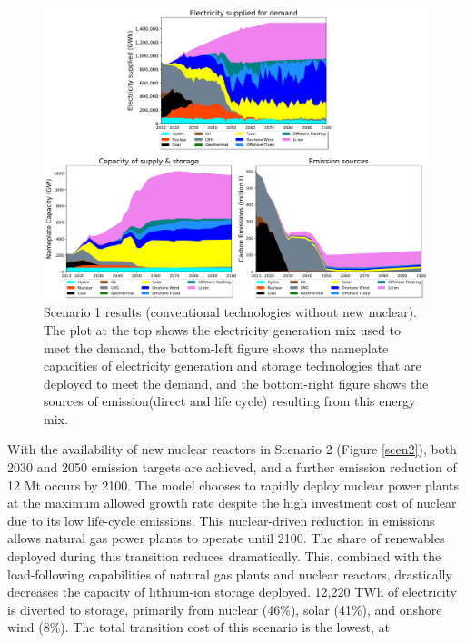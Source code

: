 \begin{figure}[H] 
\centering
\includegraphics[scale=0.5]{figures/conv_nonuc}
\caption{Scenario 1 results (conventional technologies without new nuclear). The plot at the top shows the electricity generation mix used to meet the demand, the bottom-left figure shows the nameplate capacities of electricity generation and storage technologies that are deployed to meet the demand, and the bottom-right figure shows the sources of emission(direct and life cycle) resulting from this energy mix.}
\label{scen1}
\end{figure}

With the availability of new nuclear reactors in Scenario 2 (Figure \ref{scen2}), both 2030 and 2050 emission targets are achieved, and a further emission reduction of 12 Mt occurs by 2100. The model chooses to rapidly deploy nuclear power plants at the maximum allowed growth rate despite the high investment cost of nuclear due to its low life-cycle emissions. This nuclear-driven reduction in emissions allows natural gas power plants to operate until 2100. The share of renewables deployed during this transition reduces dramatically. This, combined with the load-following capabilities of natural gas plants and nuclear reactors, drastically decreases the capacity of lithium-ion storage deployed. 12,220 TWh of electricity is diverted to storage, primarily from nuclear (46\%), solar (41\%), and onshore wind (8\%). The total transition cost of this scenario is the lowest, at \DIFdelbegin \textbf{}
\DIFdelend \DIFaddbegin {}\DIFaddend 

